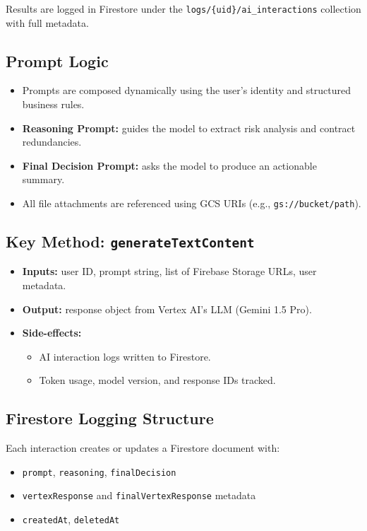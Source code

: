 Results are logged in Firestore under the \texttt{logs/\{uid\}/ai\_interactions} collection with full metadata.

\subsection*{Prompt Logic}

\begin{itemize}
    \item Prompts are composed dynamically using the user's identity and structured business rules.
    \item \textbf{Reasoning Prompt:} guides the model to extract risk analysis and contract redundancies.
    \item \textbf{Final Decision Prompt:} asks the model to produce an actionable summary.
    \item All file attachments are referenced using GCS URIs (e.g., \texttt{gs://bucket/path}).
\end{itemize}

\subsection*{Key Method: \texttt{generateTextContent}}

\begin{itemize}
    \item \textbf{Inputs:} user ID, prompt string, list of Firebase Storage URLs, user metadata.
    \item \textbf{Output:} response object from Vertex AI's LLM (Gemini 1.5 Pro).
    \item \textbf{Side-effects:}
    \begin{itemize}
        \item AI interaction logs written to Firestore.
        \item Token usage, model version, and response IDs tracked.
    \end{itemize}
\end{itemize}

\subsection*{Firestore Logging Structure}

Each interaction creates or updates a Firestore document with:

\begin{itemize}
    \item \texttt{prompt}, \texttt{reasoning}, \texttt{finalDecision}
    \item \texttt{vertexResponse} and \texttt{finalVertexResponse} metadata
    \item \texttt{createdAt}, \texttt{deletedAt}
\end{itemize}

